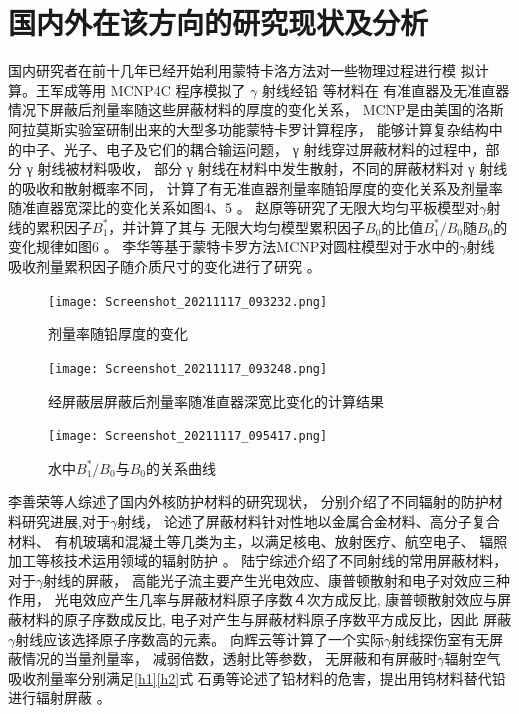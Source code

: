\section{国内外在该方向的研究现状及分析}
国内研究者在前十几年已经开始利用蒙特卡洛方法对一些物理过程进行模
拟计算。王军成等用 MCNP4C 程序模拟了 $\gamma$ 射线经铅
等材料在
有准直器及无准直器情况下屏蔽后剂量率随这些屏蔽材料的厚度的变化关系，
MCNP是由美国的洛斯阿拉莫斯实验室研制出来的大型多功能蒙特卡罗计算程序，
能够计算复杂结构中的中子、光子、电子及它们的耦合输运问题，
γ 射线穿过屏蔽材料的过程中，部分 γ 射线被材料吸收，
部分 γ 射线在材料中发生散射，不同的屏蔽材料对 γ 射线的吸收和散射概率不同，
计算了有无准直器剂量率随铅厚度的变化关系及剂量率随准直器宽深比的变化关系如图4、5
\cite{王军成2020MCNP}。
赵原等研究了无限大均匀平板模型对$\gamma$射线的累积因子$B_1^*$，并计算了其与
无限大均匀模型累积因子$B_0$的比值$B_1^*/B_0$随$B_0$的变化规律如图6
\cite{赵原2019不同计算模型对水中γ射线吸收剂量累积因子的影响}。
李华等基于蒙特卡罗方法MCNP对圆柱模型对于水中的$\gamma$射线
吸收剂量累积因子随介质尺寸的变化进行了研究
\cite{李华2017介质尺寸对水中γ射线吸收剂量累积因子的影响}。
\begin{figure}[htbp]
    \centering
    \begin{minipage}[t]{0.45\textwidth}
    \centering
    \texttt{[image: Screenshot\_20211117\_093232.png]}
    \caption{剂量率随铅厚度的变化\cite{王军成2020MCNP}}
    \end{minipage}
    \centering
    \begin{minipage}[t]{0.45\textwidth}
    \centering
    \texttt{[image: Screenshot\_20211117\_093248.png]}
    \caption{经屏蔽层屏蔽后剂量率随准直器深宽比变化的计算结果\cite{王军成2020MCNP}}
    \end{minipage}
    \end{figure}

\begin{figure}[h]
    \centering
    \texttt{[image: Screenshot\_20211117\_095417.png]}
    \caption{水中$B_1^*/B_0$与$B_0$的关系曲线\cite{赵原2019不同计算模型对水中γ射线吸收剂量累积因子的影响}}
    \end{figure}

李善荣等人综述了国内外核防护材料的研究现状，
分别介绍了不同辐射的防护材料研究进展,对于$\gamma$射线，
论述了屏蔽材料针对性地以金属合金材料、高分子复合材料、
有机玻璃和混凝土等几类为主，以满足核电、放射医疗、航空电子、
辐照加工等核技术运用领域的辐射防护
\cite{李善荣2020核辐射防护材料的研究进展}。
陆宁综述介绍了不同射线的常用屏蔽材料，对于$\gamma$射线的屏蔽，
高能光子流主要产生光电效应、康普顿散射和电子对效应三种作用，
光电效应产生几率与屏蔽材料原子序数４次方成反比,
康普顿散射效应与屏蔽材料的原子序数成反比,
电子对产生与屏蔽材料原子序数平方成反比，因此
屏蔽$\gamma$射线应该选择原子序数高的元素。
\cite{陆宁2020核辐射防护服研制}
向辉云等计算了一个实际$\gamma$射线探伤室有无屏蔽情况的当量剂量率，
减弱倍数，透射比等参数，
无屏蔽和有屏蔽时$\gamma$辐射空气吸收剂量率分别满足\eqref{h1}\eqref{h2}式
\cite{向辉云0某工业γ射线探伤室的屏蔽设计与监测评价}
石勇等论述了铅材料的危害，提出用钨材料替代铅进行辐射屏蔽
\cite{石勇2019无铅复合屏蔽材料的研究}。

